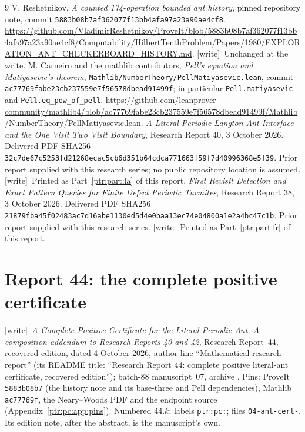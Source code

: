 \documentclass[11pt,letterpaper]{article}
\makeatletter
\newcommand{\ptrhead}{Front matter}
\theoremstyle{definition}\newtheorem{definition}[theorem]{Definition}
\theoremstyle{remark}\newtheorem{remark}[theorem]{Remark}
\newcommand{\ptrR}{}
\newcommand{\ptrstart}[2]{%
  \renewcommand{\ptrR}{#1}\setcounter{section}{0}\setcounter{equation}{0}%
  \def\Hy@chapapp{section}%
  \renewcommand{\thesection}{#1.\arabic{section}}%
  \renewcommand{\theHsection}{#1.\arabic{section}}%
  \renewcommand{\theequation}{#1.\arabic{equation}}%
  \renewcommand{\theHequation}{#1.\arabic{equation}}%
  \renewcommand{\ptrhead}{#2}}
\newcommand{\codeu}[1]{\nolinkurl{#1}}
\newcommand{\wtag}{\textup{[write]}}
\makeatother
\begin{document}
\begin{thebibliography}{9}
 V. Reshetnikov, \emph{A counted 174-operation bounded ant history}, pinned repository note, commit \codeu{5883b08b7af362077f13bb4afa97a23a90ae4cf8}. \url{https://github.com/VladimirReshetnikov/ProveIt/blob/5883b08b7af362077f13bb4afa97a23a90ae4cf8/Computability/HilbertTenthProblem/Papers/1980/EXPLORATION_ANT_CHECKERBOARD_HISTORY.md}. \wtag\ Unchanged at the write.
 M. Carneiro and the mathlib contributors, \emph{Pell's equation and Matiyasevic's theorem}, \codeu{Mathlib/NumberTheory/PellMatiyasevic.lean}, commit \codeu{ac77769fabe23cb237559e7f56578dbead91499f}; in particular \codeu{Pell.matiyasevic} and \codeu{Pell.eq_pow_of_pell}. \url{https://github.com/leanprover-community/mathlib4/blob/ac77769fabe23cb237559e7f56578dbead91499f/Mathlib/NumberTheory/PellMatiyasevic.lean}.
 \emph{A Literal Periodic Langton Ant Interface and the One Visit Two Visit Boundary}, Research Report 40, 3 October 2026. Delivered PDF SHA256 \codeu{32c7de67c5253fd21268ecac5cb6d351b64cdca771663f59f7d40996368e5f39}. Prior report supplied with this research series; no public repository location is assumed. \wtag\ Printed as Part~\ref{ptr:part:la} of this report.
 \emph{First Revisit Detection and Exact Pattern Queries for Finite Defect Periodic Turmites}, Research Report 38, 3 October 2026. Delivered PDF SHA256 \codeu{21879fba45f02483ac7d16abe1130ed5d4e0baa13ec74e04800a1e2a4bc47c1b}. Prior report supplied with this research series. \wtag\ Printed as Part~\ref{ptr:part:fr} of this report.
\end{thebibliography}
\clearpage
\ptrstart{44}{Part III: Report 44}
\label{ptr:pc:sec:intro}
\section*{Report 44: the complete positive certificate}
\noindent\wtag\ \emph{A Complete Positive Certificate for the Literal Periodic
Ant. A composition addendum to Research Reports 40 and 42}, Research
Report~44, recovered edition, dated 4 October 2026, author line ``Mathematical
research report'' (its README title: ``Research Report 44: complete positive
literal-ant certificate, recovered edition''); batch-88 manuscript~07, archive
.
Pins: ProveIt \texttt{5883b08b7} (the history note and its base-three and Pell
dependencies), Mathlib \texttt{ac77769f}, the Neary--Woods PDF and the
endpoint source (Appendix~\ref{ptr:pc:app:pins}). Numbered 44.$k$; labels
\texttt{ptr:pc:}; files \texttt{04-ant-cert-}. Its edition note, after the
abstract, is the manuscript's own.
\end{document}
